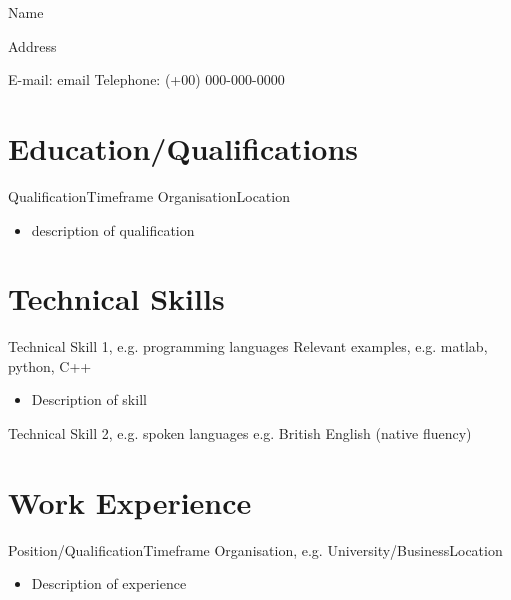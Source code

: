 \documentclass{articleCV}
\begin{document}
\begin{centering}
  {\Huge Name \par}
  \vspace{0.5\baselineskip}
  Address \par
  \vspace{0.5\baselineskip}
  E-mail: email \hspace{0.5em} Telephone: (+00) 000-000-0000 \par
\end{centering}

\vspace{\baselineskip}

\section{Education/Qualifications}

  \tab %
  {Qualification}{Timeframe} 	%
  {Organisation}{Location}	%
    \begin{itemize}
    \item description of qualification
    \end{itemize}


\section{Technical Skills}

  \tab %
  {Technical Skill 1, e.g. programming languages}{}
  {Relevant examples, e.g. matlab, python, C++}{}
    \begin{itemize}
    \item Description of skill
    \end{itemize}
    
  \tab %
  {Technical Skill 2, e.g. spoken languages}{}
  {e.g. British English (native fluency)}{}


\section{Work Experience}

  \tab %
  {Position/Qualification}{Timeframe}
  {Organisation, e.g. University/Business}{Location}
    \begin{itemize}
    \item Description of experience
    \end{itemize}
\end{document}
